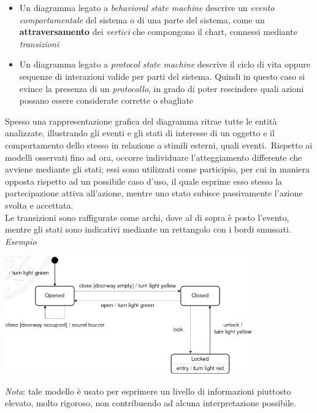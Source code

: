 \documentclass{article}
\begin{document}
\begin{itemize}[label={-}]
    \itemsep0em
    \item Un diagramma legato a \textit{behavioral state machine} descrive un \textit{evento comportamentale} del sistema o di una parte del sistema, come un \textbf{attraversamento} dei \textit{vertici} che compongono il chart, connessi mediante \textit{transizioni} 
    \item Un diagramma legato a \textit{protocol state machine} descrive il ciclo di vita oppure sequenze di interazioni valide per parti del sistema. Quindi in questo caso si evince la presenza di un \textit{protocollo}, in grado di poter rescindere quali azioni possano essere considerate corrette o sbagliate
\end{itemize}
Spesso una rappresentazione grafica del diagramma ritrae tutte le entità analizzate, illustrando gli eventi e gli stati di interesse di un oggetto e il comportamento dello stesso in relazione a stimili esterni, quali eventi.\ Rispetto ai modelli osservati fino ad ora, occorre individuare l'atteggiamento differente che avviene mediante gli stati; essi sono utilizzati come participio, per cui in maniera opposta rispetto ad un possibile caso d'uso, il quale esprime esso stesso la partecipazione attiva all'azione, mentre uno stato subisce passivamente l'azione svolta e accettata.\\Le transizioni sono raffigurate come archi, dove al di sopra è posto l'evento, mentre gli stati sono indicativi mediante un rettangolo con i bordi smussati.\vspace*{14pt}\\
\textit{Esempio}
\begin{center}
    \includegraphics[width=0.8\textwidth]{foto 1.png}
\end{center}
\textit{Nota}: tale modello è usato per esprimere un livello di informazioni piuttosto elevato, molto rigoroso, non contribuendo ad alcuna interpretazione possibile.\vspace*{14pt}\\
\end{document}
